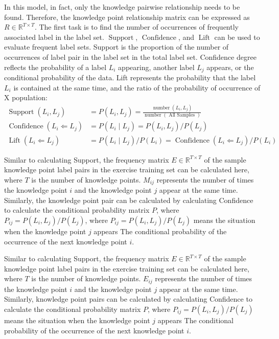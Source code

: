 In this model, in fact, only the knowledge pairwise relationship needs to be found. Therefore, the knowledge point relationship matrix can be expressed as $R\in \mathbb{R}^{T\times T}$. The first task is to find the number of occurrences of frequently associated label in the label set. $\operatorname{Support}$, $\operatorname{Confidence}$, and $\operatorname{Lift}$ can be used to evaluate frequent label sets. Support is the proportion of the number of occurrences of label pair in the label set in the total label set. Confidence degree reflects the probability of a label $L_i$ appearing, another label $L_j$ appears, or the conditional probability of the data. Lift represents the probability that the label $L_i$ is contained at the same time, and the ratio of the probability of occurrence of X population:
\begin{align}
	\operatorname{Support}(L_i, L_j)              & =P(L_i,L_j)=\frac{\operatorname{number}(L_i,L_j)}{\operatorname{number}(\text { All Samples })} \\
	\operatorname{Confidence}(L_i \Leftarrow L_j) & =P(L_i \mid L_j)=P(L_i, L_j) / P(L_j)                                                           \\
	\operatorname{Lift}(L_i \Leftarrow L_j)       & =P(L_i \mid L_j) / P(L_i)=\operatorname{Confidence}(L_i \Leftarrow L_j) / P(L_i)
\end{align}

Similar to calculating Support, the frequency matrix $E\in \mathbb{R}^{T\times T}$ of the sample knowledge point label pairs in the exercise training set can be calculated here, where $T$ is the number of knowledge points. $M_{ij}$ represents the number of times the knowledge point $i$ and the knowledge point $j$ appear at the same time. Similarly, the knowledge point pair can be calculated by calculating Confidence to calculate the conditional probability matrix $P$, where $P_{ij}=P(L_i, L_j) / P(L_j)$, where $P_{ij}=P(L_i, L_j) / P(L_j)$ means the situation when the knowledge point $j$ appears The conditional probability of the occurrence of the next knowledge point $i$.

Similar to calculating Support, the frequency matrix \(E\in \mathbb{R}^{T\times T}\) of the sample knowledge point label pairs in the exercise training set can be calculated here, where $T$ is the number of knowledge points. $E_{ij}$ represents the number of times the knowledge point $i$ and the knowledge point $j$ appear at the same time. Similarly, knowledge point pairs can be calculated by calculating Confidence to calculate the conditional probability matrix $P$, where $P_{ij}=P(L_i, L_j) / P(L_j)$ means the situation when the knowledge point $j$ appears The conditional probability of the occurrence of the next knowledge point $i$.

